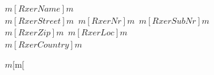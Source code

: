 \documentclass[
	version=last,							%
	BCOR=0mm,								%
	paper=portrait,							%
	paper=a4,								%
	fontsize=11pt,							%
	foldmarks=true,							%
	foldmarks=HPV,							%
	enlargefirstpage=on,					%
	firsthead=true,							%
	fromalign=left,							%
	fromrule=afteraddress,					%
	fromurl=false,							%
	fromemail=false,						%
	fromfax=false,							%
	fromphone=false,						%
	frommobilephone=false,					%
	fromlogo=true,							%
	symbolicnames=true,						%
	locfield=wide,							%
	headsepline=true,						%
	footsepline=true,						%
	pagenumber=footright					%
]{scrlttr2}
\begin{document}
{{{{{{{{{{{{%
%
%
%
%
%
%
%
%

\begin{letter}{%
	$m[RxerName]m$\\
	$m[RxerStreet]m$\ $m[RxerNr]m$\ $m[RxerSubNr]m$\\
	$m[RxerZip]m$\ $m[RxerLoc]m$\\
	$m[RxerCountry]m$
}

$m[%
$m[%



\end{letter}}}}}}}}}}}}}
\end{document}
